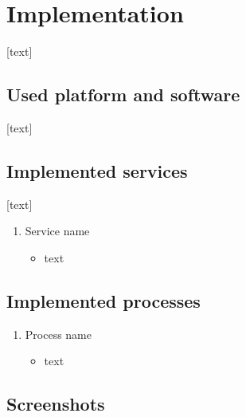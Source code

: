 \documentclass[11pt,a4paper]{article}
\begin{document}
\newpage




\section{Implementation}

[text]


\subsection{Used platform and software}

[text]


\subsection{Implemented services}

[text]

\begin{enumerate}
    \item Service name
    \begin{itemize}
        \item text
    \end{itemize}
\end{enumerate}


\subsection{Implemented processes}

\begin{enumerate}
    \item Process name
    \begin{itemize}
        \item text
    \end{itemize}
\end{enumerate}


\subsection{Screenshots}
\end{document}
